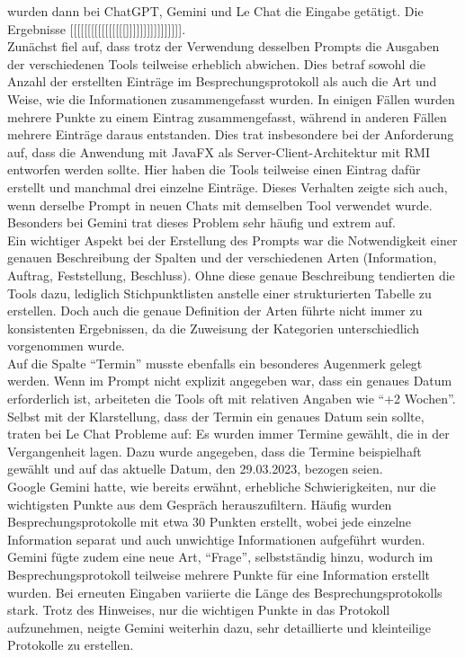 wurden dann bei ChatGPT, Gemini und Le Chat die Eingabe getätigt. Die Ergebnisse [[[[[[[[[[[[[[[[]]]]]]]]]]]]]]]].\\

Zunächst fiel auf, dass trotz der Verwendung desselben Prompts die Ausgaben der verschiedenen Tools teilweise erheblich abwichen. 
Dies betraf sowohl die Anzahl der erstellten Einträge im Besprechungsprotokoll als auch die Art und Weise, wie die Informationen 
zusammengefasst wurden. In einigen Fällen wurden mehrere Punkte zu einem Eintrag zusammengefasst, während in anderen Fällen mehrere 
Einträge daraus entstanden. Dies trat insbesondere bei der Anforderung auf, dass die Anwendung mit JavaFX als Server-Client-Architektur 
mit RMI entworfen werden sollte. Hier haben die Tools teilweise einen Eintrag dafür erstellt und manchmal drei einzelne Einträge. 
Dieses Verhalten zeigte sich auch, wenn derselbe Prompt in neuen Chats mit demselben Tool verwendet wurde. Besonders bei Gemini trat 
dieses Problem sehr häufig und extrem auf.\\

Ein wichtiger Aspekt bei der Erstellung des Prompts war die Notwendigkeit einer genauen Beschreibung der Spalten und der verschiedenen 
Arten (Information, Auftrag, Feststellung, Beschluss). Ohne diese genaue Beschreibung tendierten die Tools dazu, lediglich 
Stichpunktlisten anstelle einer strukturierten Tabelle zu erstellen. Doch auch die genaue Definition der Arten führte nicht immer zu 
konsistenten Ergebnissen, da die Zuweisung der Kategorien unterschiedlich vorgenommen wurde.\\

Auf die Spalte ``Termin'' musste ebenfalls ein besonderes Augenmerk gelegt werden. Wenn im Prompt nicht explizit angegeben war, dass ein 
genaues Datum erforderlich ist, arbeiteten die Tools oft mit relativen Angaben wie ``+2 Wochen''. Selbst mit der Klarstellung, dass der 
Termin ein genaues Datum sein sollte, traten bei Le Chat Probleme auf: Es wurden immer Termine gewählt, die in der Vergangenheit lagen. 
Dazu wurde angegeben, dass die Termine beispielhaft gewählt und auf das aktuelle Datum, den 29.03.2023, bezogen seien.\\

Google Gemini hatte, wie bereits erwähnt, erhebliche Schwierigkeiten, nur die wichtigsten Punkte aus dem Gespräch herauszufiltern. 
Häufig wurden Besprechungsprotokolle mit etwa 30 Punkten erstellt, wobei jede einzelne Information separat und auch unwichtige 
Informationen aufgeführt wurden. Gemini fügte zudem eine neue Art, ``Frage'', selbstständig hinzu, wodurch im Besprechungsprotokoll 
teilweise mehrere Punkte für eine Information erstellt wurden. Bei erneuten Eingaben variierte die Länge des Besprechungsprotokolls 
stark. Trotz des Hinweises, nur die wichtigen Punkte in das Protokoll aufzunehmen, neigte Gemini weiterhin dazu, sehr detaillierte und 
kleinteilige Protokolle zu erstellen.\\

